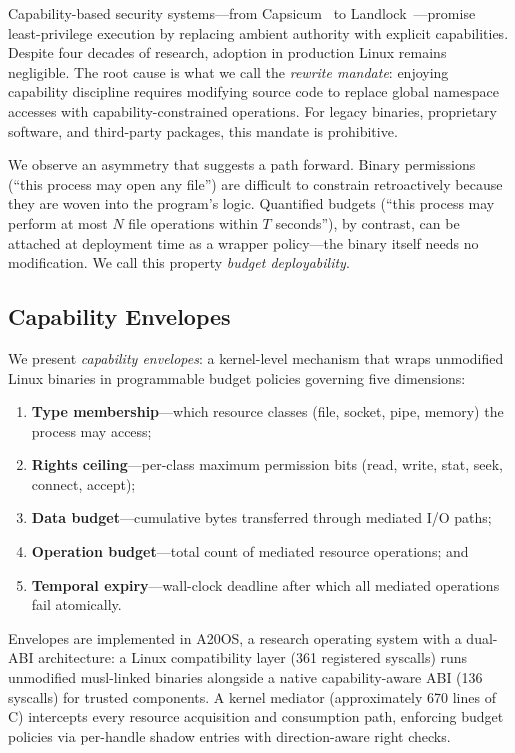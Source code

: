 \documentclass[letterpaper,twocolumn,10pt]{article}
\begin{document}
Capability-based security systems---from Capsicum~\cite{watson2010capsicum}
to Landlock~\cite{landlock2023}---promise least-privilege execution by
replacing ambient authority with explicit capabilities.  Despite four
decades of research, adoption in production Linux remains negligible.
The root cause is what we call the \emph{rewrite mandate}: enjoying
capability discipline requires modifying source code to replace global
namespace accesses with capability-constrained operations.  For legacy
binaries, proprietary software, and third-party packages, this mandate
is prohibitive.

We observe an asymmetry that suggests a path forward.  Binary
permissions (``this process may open any file'') are difficult to
constrain retroactively because they are woven into the program's logic.
Quantified budgets (``this process may perform at most $N$ file
operations within $T$ seconds''), by contrast, can be attached at
deployment time as a wrapper policy---the binary itself needs no
modification.  We call this property \emph{budget deployability}.

\subsection{Capability Envelopes}

We present \emph{capability envelopes}: a kernel-level mechanism that
wraps unmodified Linux binaries in programmable budget policies
governing five dimensions:

\begin{enumerate}
\item \textbf{Type membership}---which resource classes (file, socket,
      pipe, memory) the process may access;
\item \textbf{Rights ceiling}---per-class maximum permission bits
      (read, write, stat, seek, connect, accept);
\item \textbf{Data budget}---cumulative bytes transferred through
      mediated I/O paths;
\item \textbf{Operation budget}---total count of mediated resource
      operations; and
\item \textbf{Temporal expiry}---wall-clock deadline after which all
      mediated operations fail atomically.
\end{enumerate}

Envelopes are implemented in A20OS, a research operating system with a
dual-ABI architecture: a Linux compatibility layer (361 registered
syscalls) runs unmodified musl-linked binaries alongside a native
capability-aware ABI (136 syscalls) for trusted components.  A kernel
mediator (approximately 670 lines of C) intercepts every resource acquisition
and consumption path, enforcing budget policies via per-handle shadow
entries with direction-aware right checks.
\end{document}
